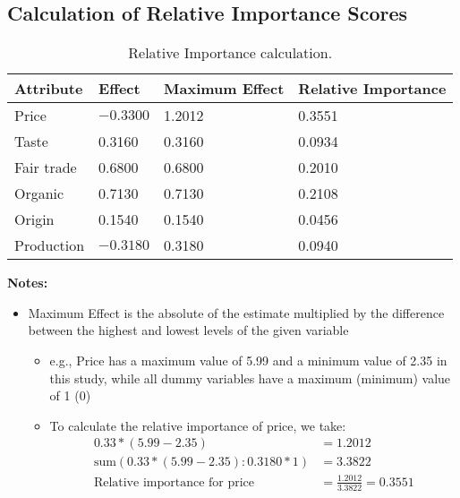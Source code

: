 \documentclass[sustainability,article,accept,moreauthors,pdftex,10pt,a4paper]{Definitions/mdpi}
\theoremstyle{mdpi}
\newcounter{ex}
\newcounter{re}
\theoremstyle{mdpidefinition}
\begin{document}
{\subsection{Calculation of Relative Importance Scores \label{a.2}} %
\begin{center}
\begin{table}[H]
\caption{Relative Importance calculation.}
\label{relativeimportance}
\centering
\begin{tabular}{ p{2cm}p{2cm}p{3cm} p{3cm} }
\toprule
\textbf{Attribute}& \textbf{Effect }& \textbf{Maximum Effect }& \textbf{Relative Importance}\\
\midrule
Price & $-0.3300$ & 1.2012 & 0.3551 \\
Taste & 0.3160 & 0.3160 & 0.0934 \\
Fair trade & 0.6800 & 0.6800 & 0.2010 \\
Organic & 0.7130 & 0.7130 & 0.2108 \\
Origin & 0.1540 & 0.1540 & 0.0456 \\
Production & $-0.3180$ & 0.3180 & 0.0940 \\ \bottomrule
\end{tabular}
\end{table}
\end{center}
\par{\textbf{Notes:}
\begin{itemize}
\item Maximum Effect is the absolute of the estimate multiplied by the difference between the highest and lowest levels of the given variable
\begin{itemize}
\item e.g., Price has a maximum value of 5.99 and a minimum value of 2.35 in this study, while all dummy variables have a maximum (minimum) value of 1 (0)
\item To calculate the relative importance of price, we take:
\begin{equation*}
\begin{split}
0.33*(5.99-2.35) & = 1.2012 \\
\mbox{sum} (0.33*(5.99-2.35) : 0.3180*1) & = 3.3822 \\
\mbox{Relative importance for price } & = \frac{1.2012}{3.3822}  = 0.3551
\end{split}
\end{equation*}
\end{itemize}
\end{itemize}
\newpage
}}
\end{document}
